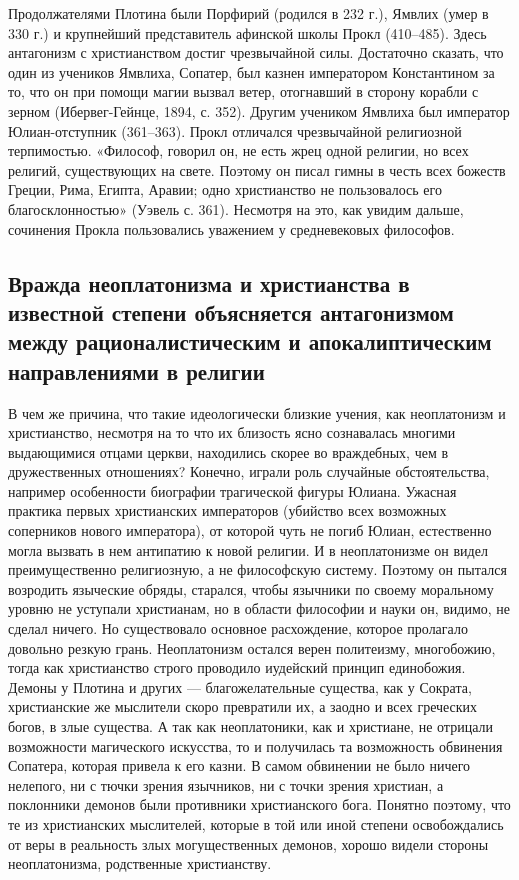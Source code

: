 Продолжателями  Плотина  были  Порфирий  (родился в  232  г.),  Ямвлих
(умер  в  330 г.)  и  крупнейший  представитель афинской  школы  Прокл
(410--485). Здесь антагонизм с христианством достиг чрезвычайной силы.
Достаточно  сказать,  что  один  из  учеников  Ямвлиха,  Сопатер,  был
казнен  императором  Константином  за  то, что  он  при  помощи  магии
вызвал ветер,  отогнавший в сторону корабли  с зерном (Ибервег-Гейнце,
1894, с.  352). Другим учеником Ямвлиха  был император Юлиан-отступник
(361--363).  Прокл  отличался  чрезвычайной  религиозной  терпимостью.
«Философ, говорил  он, не  есть жрец одной  религии, но  всех религий,
существующих на  свете. Поэтому  он писал гимны  в честь  всех божеств
Греции, Рима,  Египта, Аравии;  одно христианство не  пользовалось его
благосклонностью» (Уэвель с. 361). Несмотря на это, как увидим дальше,
сочинения Прокла пользовались уважением у средневековых философов.

\subsection{Вражда  неоплатонизма и  христианства в  известной степени
объясняется антагонизмом  между рационалистическим  и апокалиптическим
направлениями в религии}

В  чем  же  причина,  что  такие  идеологически  близкие  учения,  как
неоплатонизм  и христианство,  несмотря  на то  что  их близость  ясно
сознавалась многими  выдающимися отцами  церкви, находились  скорее во
враждебных,  чем  в  дружественных отношениях?  Конечно,  играли  роль
случайные обстоятельства,  например особенности  биографии трагической
фигуры  Юлиана.  Ужасная   практика  первых  христианских  императоров
(убийство  всех возможных  соперников нового  императора), от  которой
чуть не погиб Юлиан, естественно могла вызвать в нем антипатию к новой
религии.  И  в  неоплатонизме он  видел  преимущественно  религиозную,
а  не  философскую систему.  Поэтому  он  пытался возродить  языческие
обряды,  старался,  чтобы  язычники  по своему  моральному  уровню  не
уступали христианам,  но в  области философии и  науки он,  видимо, не
сделал ничего. Но существовало основное расхождение, которое пролагало
довольно   резкую  грань.   Неоплатонизм  остался   верен  политеизму,
многобожию, тогда как христианство  строго проводило иудейский принцип
единобожия. Демоны  у Плотина и других  --- благожелательные существа,
как у Сократа, христианские же мыслители скоро превратили их, а заодно
и всех греческих  богов, в злые существа. А так  как неоплатоники, как
и  христиане,  не отрицали  возможности  магического  искусства, то  и
получилась та  возможность обвинения  Сопатера, которая привела  к его
казни. В  самом обвинении не было  ничего нелепого, ни с  тючки зрения
язычников,  ни с  точки  зрения христиан,  а  поклонники демонов  были
противники христианского бога. Понятно поэтому, что те из христианских
мыслителей,  которые в  той  или иной  степени  освобождались от  веры
в  реальность  злых  могущественных  демонов,  хорошо  видели  стороны
неоплатонизма, родственные христианству.

